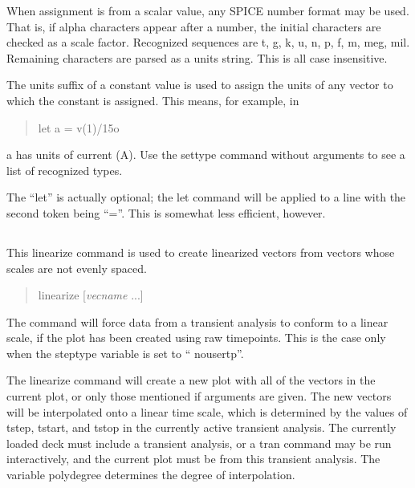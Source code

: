 When assignment is from a scalar value, any SPICE number format may be
used.  That is, if alpha characters appear after a number, the initial
characters are checked as a scale factor.  Recognized sequences are t,
g, k, u, n, p, f, m, meg, mil.  Remaining characters are parsed as a
units string.  This is all case insensitive.

The units suffix of a constant value is used to assign the units
of any vector to which the constant is assigned.  This means, for
example, in
\begin{quote}\vt
    let a = v(1)/15o
\end{quote}
{\vt a} has units of current (A).  Use the {\cb settype} command
without arguments to see a list of recognized types.

The ``let'' is actually optional; the {\cb let} command will be
applied to a line with the second token being ``=''.  This is somewhat
less efficient, however.

\subsection{}


This {\cb linearize} command is used to create linearized vectors from
vectors whose scales are not evenly spaced. 
\begin{quote}\vt
linearize [{\it vecname\/} ...]
\end{quote}
The command will force data from a transient analysis to conform to a
linear scale, if the plot has been created using raw timepoints.  This
is the case only when the {\et steptype} variable is set to ``{\vt
nousertp}''. 

The {\cb linearize} command will create a new plot with all of the
vectors in the current plot, or only those mentioned if arguments are
given.  The new vectors will be interpolated onto a linear time scale,
which is determined by the values of {\vt tstep}, {\vt tstart}, and
{\vt tstop} in the currently active transient analysis.  The currently
loaded deck must include a transient analysis, or a {\cb tran} command
may be run interactively, and the current plot must be from this
transient analysis.  The variable {\et polydegree} determines the
degree of interpolation.

\subsection{}

